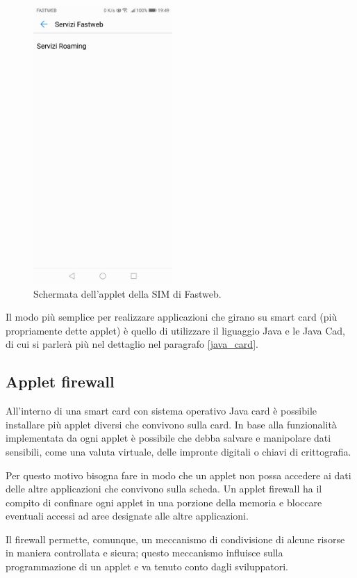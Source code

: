 \begin{figure}[h!]
  \centering
  \includegraphics[width=150pt]{pictures/screen_aplet_fastweb.jpg}
  \caption{Schermata dell'applet della SIM di Fastweb.}
  \label{fig:app_screen}
\end{figure}

Il modo più semplice per realizzare applicazioni che girano su smart card (più propriamente dette applet) è quello di utilizzare il liguaggio Java e le Java Cad, di cui si parlerà più nel dettaglio nel paragrafo \ref{java_card}.
\cite{secret_life}

\subsection{Applet firewall}
All'interno di una smart card con sistema operativo Java card è possibile installare più applet diversi che convivono sulla card. In base alla funzionalità implementata da ogni applet è possibile che debba salvare e manipolare dati sensibili, come una valuta virtuale, delle impronte digitali o chiavi di crittografia.

Per questo motivo bisogna fare in modo che un applet non possa accedere ai dati delle altre applicazioni che convivono sulla scheda. Un applet firewall ha il compito di confinare ogni applet in una porzione della memoria e bloccare eventuali accessi ad aree designate alle altre applicazioni.

Il firewall permette, comunque, un meccanismo di condivisione di alcune risorse in maniera controllata e sicura; questo meccanismo influisce sulla programmazione di un applet e va tenuto conto dagli sviluppatori.


